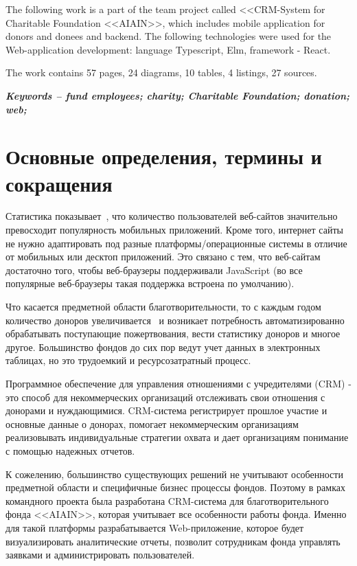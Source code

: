 \documentclass[a4paper,12pt,reqno]{article}
\begin{document}
The following work is a part of the team project called <<CRM-System for Charitable Foundation <<AIAIN>>, which includes mobile application for donors and donees and backend.
The following technologies were used for the Web-application development: language Typescript, Elm, framework - React. 

The work contains 57 pages, 24 diagrams, 10 tables, 4 listings, 27 sources.

\textit{\textbf{Keywords -- fund employees; charity; Charitable Foundation; donation; web;}}

\newpage

\section*{Основные определения, термины и сокращения}
\label{s:terms}



\newpage

\tableofcontents

\newpage


Статистика показывает~\cite{statistics}, что количество пользователей веб-сайтов значительно превосходит популярность мобильных приложений. Кроме того, интернет сайты не нужно адаптировать под разные платформы/операционные системы в отличие от мобильных или десктоп приложений. Это связано с тем, что веб-сайтам достаточно того, чтобы веб-браузеры поддерживали JavaScript (во все популярные веб-браузеры такая поддержка встроена по умолчанию).


Что касается предметной области благотворительности, то с каждым годом количество доноров увеличивается~\cite{ieee} и возникает потребность автоматизированно обрабатывать поступающие пожертвования, вести статистику доноров и многое другое. Большинство фондов до сих пор ведут учет данных в электронных таблицах, но это трудоемкий и ресурсозатратный процесс. 

Программное обеспечение для управления отношениями с учредителями (CRM) - это способ для некоммерческих организаций отслеживать свои отношения с донорами и нуждающимися. CRM-система регистрирует прошлое участие и основные данные о донорах, помогает некоммерческим организациям реализовывать индивидуальные стратегии охвата и дает организациям понимание с помощью надежных отчетов. 

К сожелению, большинство существующих решений не учитывают особенности предметной области и специфичные бизнес процессы фондов. Поэтому в рамках командного проекта была разработана CRM-система для благотворительного фонда <<AIAIN>>, которая учитывает все особенности работы фонда. Именно для такой платформы разрабатывается Web-приложение, которое будет визуализировать аналитические отчеты, позволит сотрудникам фонда управлять заявками и администрировать пользователей. 
\end{document}
